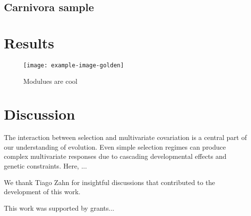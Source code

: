 \subsection*{Carnivora sample}


\section*{Results}


\begin{figure}[h]
\texttt{[image: example-image-golden]}
\caption[Factors and modules]{ Modulues are cool }
\label{fig:example-fig}
\end{figure}



\section*{Discussion}

The interaction between selection and multivariate covariation is a
central part of our understanding of evolution. Even simple selection
regimes can produce complex multivariate responses due to cascading
developmental effects and genetic constraints. Here, ...


\begin{notes}[Acknowledgments]
We thank Tiago Zahn for insightful discussions that contributed to the
development of this work.
\end{notes}

\begin{notes}[Funding]
This work was supported by grants...
\end{notes}
